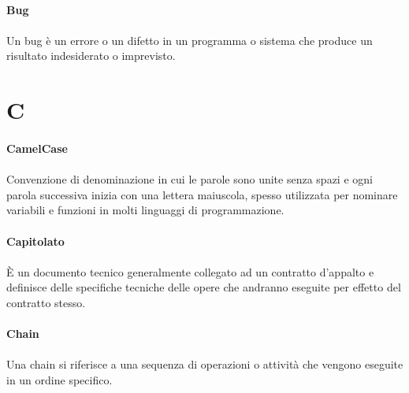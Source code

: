 \documentclass[10pt, a4paper]{article}
\begin{document}
\vspace{2em}
\paragraph{Bug}\noindent\hrulefill
\paragraph{}Un bug è un errore o un difetto in un programma o sistema che produce un risultato indesiderato o imprevisto.





\newpage
\section{C}

\vspace{2em}
\paragraph{CamelCase}\noindent\hrulefill
\paragraph{}Convenzione di denominazione in cui le parole sono unite senza spazi e ogni parola successiva inizia con una lettera maiuscola, spesso utilizzata per nominare variabili e funzioni in molti linguaggi di programmazione.


\vspace{2em}
\paragraph{Capitolato}\noindent\hrulefill\noindent\hrulefill
\paragraph{} È un documento tecnico generalmente collegato ad un contratto d'appalto e definisce delle specifiche tecniche delle opere che andranno eseguite per effetto del contratto stesso.

\vspace{2em}
\paragraph{Chain}\noindent\hrulefill
\paragraph{}Una chain si riferisce a una sequenza di operazioni o attività che vengono eseguite in un ordine specifico.
\end{document}

